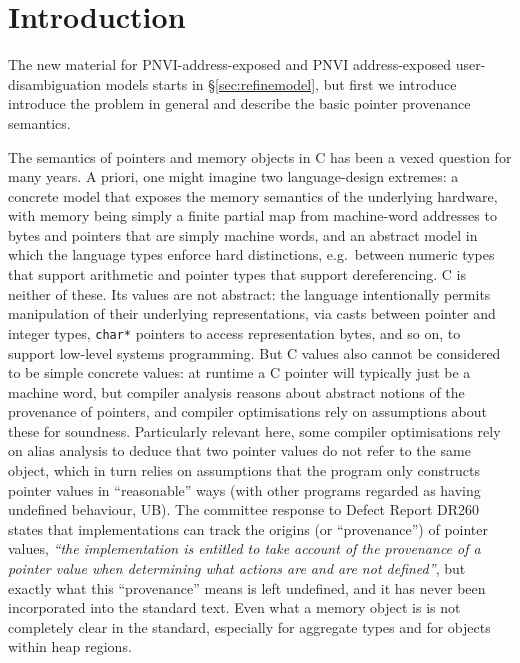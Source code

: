 \documentclass[acmsmall,review,screen]{acmart}\settopmatter{printfolios=true,printccs=false,printacmref=false}
\begin{document}
\newcommand{\myt}[1]{{\color{blue}#1}}
\newcommand{\myu}[1]{{\color{myudicolor}#1}}

\tableofcontents

\section{Introduction}

The new material for PNVI-address-exposed and PNVI address-exposed
user-disambiguation models starts in \S\ref{sec:refinemodel}, but
first we introduce introduce the problem in general and describe the
basic pointer provenance semantics. 

The semantics of pointers and memory objects in C has been a vexed 
question for many years. 
%
A priori, one might imagine two language-design extremes: 
%
a concrete model that exposes the memory semantics of the underlying
hardware, with memory being simply a finite partial map from
machine-word addresses to bytes and pointers that are simply machine words,
%
and an abstract model in which the language types enforce hard
distinctions, e.g.~between numeric types that support arithmetic and
pointer types that support dereferencing.
%
C is neither of these.
Its values are not abstract: the language intentionally permits manipulation of their
underlying representations, via casts between pointer and integer
types, \texttt{char*} pointers to access representation bytes, and so on,
to support low-level systems programming.
%
But C values also cannot be considered to be simple concrete values: 
at runtime a C pointer will typically just be a machine word, 
but compiler analysis reasons about abstract notions of the 
provenance of pointers, 
and compiler optimisations rely on assumptions about these for soundness. 
Particularly relevant here, 
some compiler optimisations rely on alias analysis to deduce that two
pointer values do not refer to the same object, which in turn
relies on assumptions that the program only constructs pointer values
in ``reasonable'' ways (with other programs regarded as having
undefined behaviour, UB).  The committee response to Defect Report
DR260~\cite{dr260} states that implementations can track the origins (or ``provenance'')
of pointer values, 
\emph{``the implementation is entitled to take account of the
 provenance of a pointer value when determining what actions are and
  are not defined''}, but exactly what this ``provenance'' means is
left undefined, and it has never been incorporated into the standard
text.   Even what a memory object is is not completely
clear in the standard, especially for aggregate types and for objects
within heap
regions.  
\end{document}
